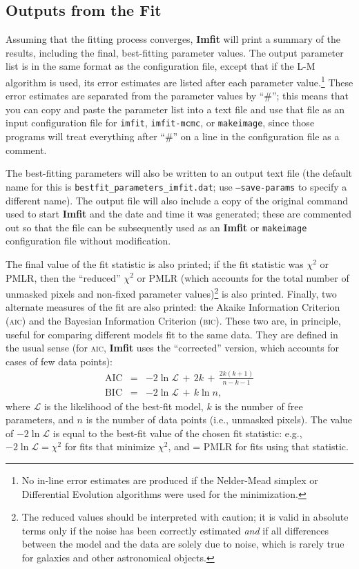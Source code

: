 \documentclass[10pt,a4paper,article]{memoir}
\newcommand{\imfit}{\textbf{Imfit}}
\newcommand{\imfitprog}{\texttt{imfit}}
\newcommand{\imfitmcmc}{\texttt{imfit-mcmc}}
\newcommand{\makeimage}{\texttt{makeimage}}
\newcommand{\chisquare}{\ensuremath{\chi^{2}}}
\begin{document}
\subsection{Outputs from the Fit}

Assuming that the fitting process converges, \imfit{} will print a
summary of the results, including the final, best-fitting parameter
values. The output parameter list is in the same format as the
configuration file, except that if the L-M algorithm is used, its error
estimates are listed after each parameter value.\footnote{No in-line
error estimates are produced if the Nelder-Mead simplex or Differential
Evolution algorithms were used for the minimization.} These error
estimates are separated from the parameter values by ``\#''; this means
that you can copy and paste the parameter list into a text file and use
that file as an input configuration file for \imfitprog, \imfitmcmc, or
\makeimage, since those programs will treat everything after ``\#'' on a
line in the configuration file as a comment. 

The best-fitting parameters will also be written to an output text file
(the default name for this is \texttt{bestfit\_parameters\_imfit.dat};
use \texttt{--save-params} to specify a different name). The output file
will also include a copy of the original command used to start \imfit{}
and the date and time it was generated; these are commented out so that
the file can be subsequently used as an \imfit{} or \makeimage{}
configuration file without modification.

The final value of the fit statistic is also printed; if the fit
statistic was \chisquare{} or PMLR, then the ``reduced'' $\chi^{2}$ or
PMLR (which accounts for the total number of unmasked pixels and
non-fixed parameter values)\footnote{The reduced values should be
interpreted with caution; it is valid in absolute terms only if the
noise has been correctly estimated \textit{and} if all differences
between the model and the data are solely due to noise, which is rarely
true for galaxies and other astronomical objects.} is also printed.
Finally, two alternate measures of the fit are also printed: the Akaike
Information Criterion (\textsc{aic}) and the Bayesian Information
Criterion (\textsc{bic}). These two are, in principle, useful for
comparing different models fit to the same data. They are defined in the
usual sense (for \textsc{aic}, \imfit{} uses the ``corrected'' version,
which accounts for cases of few data points):
\begin{eqnarray}
\mathrm{AIC} & = & -2 \ln \mathcal{L} \, +\,  2k \, + \, \frac{2k(k + 1)}{n - k - 1} \\
\mathrm{BIC} & = & -2 \ln \mathcal{L} \, + \, k \ln n ,
\end{eqnarray}
where $\mathcal{L}$ is the likelihood of the best-fit model, $k$ is the
number of free parameters, and $n$ is the number of data points (i.e.,
unmasked pixels). The value of $-2 \ln \mathcal{L}$ is equal to the
best-fit value of the chosen fit statistic: e.g., $-2 \ln \mathcal{L} =
\chisquare$ for fits that minimize \chisquare{}, and = PMLR for fits
using that statistic.
\end{document}

